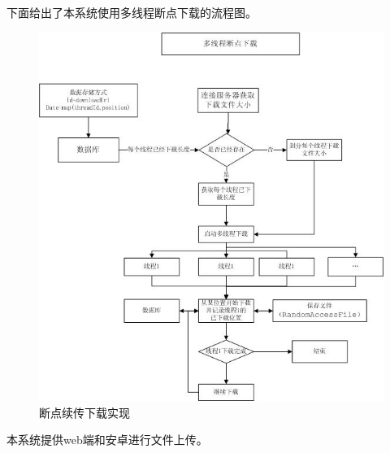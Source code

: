 下面给出了本系统使用多线程断点下载的流程图。
\begin{figure}[H]
  \centering
  \includegraphics[width=130mm]{./figures/duandian.jpg}
  \caption{断点续传下载实现}
\end{figure}
本系统提供web端和安卓进行文件上传。

